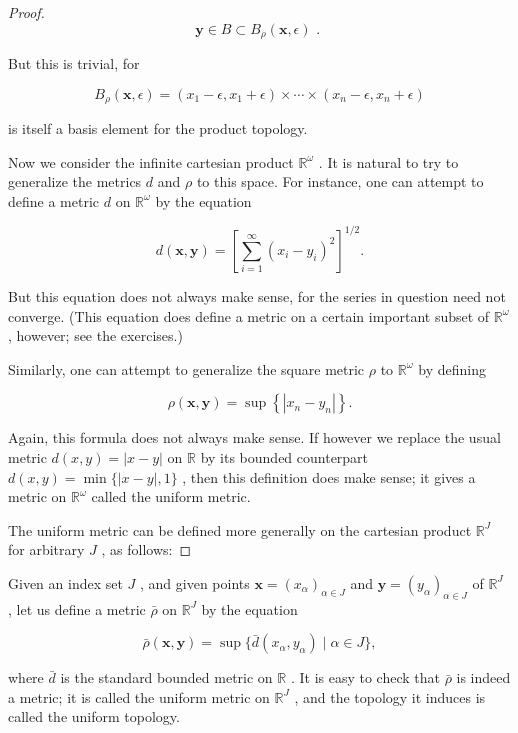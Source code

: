 \begin{proof}
\[
\mathbf{y} \in  B \subset  {B}_{\rho }\left( {\mathbf{x},\epsilon }\right) \text{ . }
\]

But this is trivial, for

\[
{B}_{\rho }\left( {\mathbf{x},\epsilon }\right)  = \left( {{x}_{1} - \epsilon ,{x}_{1} + \epsilon }\right)  \times  \cdots  \times  \left( {{x}_{n} - \epsilon ,{x}_{n} + \epsilon }\right)
\]

is itself a basis element for the product topology.

Now we consider the infinite cartesian product \({\mathbb{R}}^{\omega }\) . It is natural to try to generalize the metrics \(d\) and \(\rho\) to this space. For instance, one can attempt to define a metric \(d\) on \({\mathbb{R}}^{\omega }\) by the equation

\[
d\left( {\mathbf{x},\mathbf{y}}\right)  = {\left\lbrack  \mathop{\sum }\limits_{{i = 1}}^{\infty }{\left( {x}_{i} - {y}_{i}\right) }^{2}\right\rbrack  }^{1/2}.
\]

But this equation does not always make sense, for the series in question need not converge. (This equation does define a metric on a certain important subset of \({\mathbb{R}}^{\omega }\) , however; see the exercises.)

Similarly, one can attempt to generalize the square metric \(\rho\) to \({\mathbb{R}}^{\omega }\) by defining

\[
\rho \left( {\mathbf{x},\mathbf{y}}\right)  = \sup \left\{  \left| {{x}_{n} - {y}_{n}}\right| \right\}  .
\]

Again, this formula does not always make sense. If however we replace the usual metric \(d\left( {x,y}\right)  = \left| {x - y}\right|\) on \(\mathbb{R}\) by its bounded counterpart \(d\left( {x,y}\right)  = \min \{ \left| {x - y}\right| ,1\}\) , then this definition does make sense; it gives a metric on \({\mathbb{R}}^{\omega }\) called the uniform metric.

The uniform metric can be defined more generally on the cartesian product \({\mathbb{R}}^{J}\) for arbitrary \(J\) , as follows:
\end{proof}

\begin{definition} Given an index set \(J\) , and given points \(\mathbf{x} = {\left( {x}_{\alpha }\right) }_{\alpha  \in  J}\) and \(\mathbf{y} = {\left( {y}_{\alpha }\right) }_{\alpha  \in  J}\) of \({\mathbb{R}}^{J}\) , let us define a metric \(\bar{\rho }\) on \({\mathbb{R}}^{J}\) by the equation

\[
\bar{\rho }\left( {\mathbf{x},\mathbf{y}}\right)  = \sup \{ \bar{d}\left( {{x}_{\alpha },{y}_{\alpha }}\right)  \mid  \alpha  \in  J\} ,
\]

where \(\bar{d}\) is the standard bounded metric on \(\mathbb{R}\) . It is easy to check that \(\bar{\rho }\) is indeed a metric; it is called the uniform metric on \({\mathbb{R}}^{J}\) , and the topology it induces is called the uniform topology.
\end{definition}

